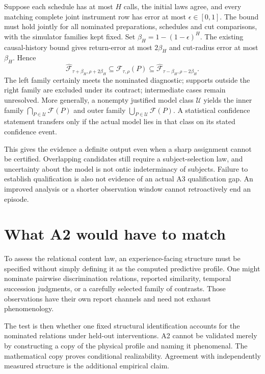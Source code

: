 Suppose each schedule has at most $H$ calls, the initial laws agree, and every matching complete joint instrument row has error at most $\epsilon\in[0,1]$. The bound must hold jointly for all nominated preparations, schedules and cut comparisons, with the simulator families kept fixed. Set $\beta_H=1-(1-\epsilon)^H$. The existing causal-history bound gives return-error at most $2\beta_H$ and cut-radius error at most $\beta_H$. Hence
\[
\widehat{\mathcal F}_{\tau+\beta_H,\rho+2\beta_H}
\subseteq\mathcal F_{\tau,\rho}(P)
\subseteq
\widehat{\mathcal F}_{\tau-\beta_H,\rho-2\beta_H}.
\]
The left family certainly meets the nominated diagnostic; supports outside the right family are excluded under its contract; intermediate cases remain unresolved. More generally, a nonempty justified model class $\mathcal U$ yields the inner family $\bigcap_{P\in\mathcal U}\mathcal F(P)$ and outer family $\bigcup_{P\in\mathcal U}\mathcal F(P)$. A statistical confidence statement transfers only if the actual model lies in that class on its stated confidence event.

This gives the evidence a definite output even when a sharp assignment cannot be certified. Overlapping candidates still require a subject-selection law, and uncertainty about the model is not ontic indeterminacy of subjects. Failure to establish qualification is also not evidence of an actual A3 qualification gap. An improved analysis or a shorter observation window cannot retroactively end an episode.

\section{What A2 would have to match}\label{section:evidence:what-a2-would-have-to-match}
To assess the relational content law, an experience-facing structure must be specified without simply defining it as the computed predictive profile. One might nominate pairwise discrimination relations, reported similarity, temporal succession judgments, or a carefully selected family of contrasts. Those observations have their own report channels and need not exhaust phenomenology.

The test is then whether one fixed structural identification accounts for the nominated relations under held-out interventions. A2 cannot be validated merely by constructing a copy of the physical profile and naming it phenomenal. The mathematical copy proves conditional realizability. Agreement with independently measured structure is the additional empirical claim.

